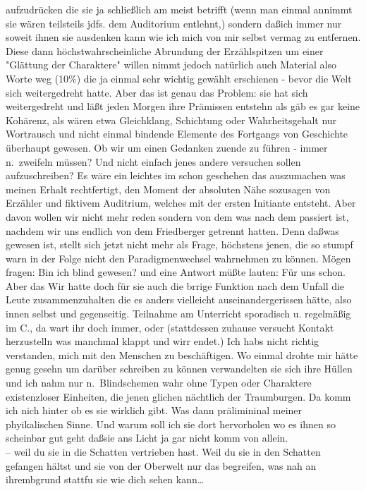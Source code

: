 \documentclass[
]{article}
\begin{document}
aufzudrücken die sie ja schließlich am meist betrifft (wenn man einmal
annimmt sie wären teilsteils jdfs. dem Auditorium entlehnt,) sondern
daßich immer nur soweit ihnen sie ausdenken kann wie ich mich von mir
selbst vermag zu entfernen. Diese dann höchstwahrscheinliche Abrundung
der Erzählspitzen um einer "Glättung der Charaktere" willen nimmt jedoch
natürlich auch Material also Worte weg (10\%) die ja einmal sehr wichtig
gewählt erschienen - bevor die Welt sich weitergedreht hatte. Aber das
ist genau das Problem: sie hat sich weitergedreht und läßt jeden Morgen
ihre Prämissen entstehn als gäb es gar keine Kohärenz, als wären etwa
Gleichklang, Schichtung oder Wahrheitsgehalt nur Wortrausch und nicht
einmal bindende Elemente des Fortgangs von Geschichte überhaupt gewesen.
Ob wir um einen Gedanken zuende zu führen - immer n.~zweifeln müssen?
Und nicht einfach jenes andere versuchen sollen aufzuschreiben? Es wäre
ein leichtes im schon geschehen das auszumachen was meinen Erhalt
rechtfertigt, den Moment der absoluten Nähe sozusagen von Erzähler und
fiktivem Auditrium, welches mit der ersten Initiante entsteht. Aber
davon wollen wir nicht mehr reden sondern von dem was nach dem passiert
ist, nachdem wir uns endlich von dem Friedberger getrennt hatten. Denn
daßwas gewesen ist, stellt sich jetzt nicht mehr als Frage, höchstens
jenen, die so stumpf warn in der Folge nicht den Paradigmenwechsel
wahrnehmen zu können. Mögen fragen: Bin ich blind gewesen? und eine
Antwort müßte lauten: Für uns schon. Aber das Wir hatte doch für sie
auch die brrige Funktion nach dem Unfall die Leute zusammenzuhalten die
es anders vielleicht auseinandergerissen hätte, also innen selbst und
gegenseitig. Teilnahme am Unterricht sporadisch u. regelmäßig im C., da
wart ihr doch immer, oder (stattdessen zuhause versucht Kontakt
herzustelln was manchmal klappt und wirr endet.) Ich habs nicht richtig
verstanden, mich mit den Menschen zu beschäftigen. Wo einmal drohte mir
hätte genug gesehn um darüber schreiben zu können verwandelten sie sich
ihre Hüllen und ich nahm nur n.~Blindschemen wahr ohne Typen oder
Charaktere existenzloser Einheiten, die jenen glichen nächtlich der
Traumburgen. Da komm ich nich hinter ob es sie wirklich gibt. Was dann
prälimininal meiner phyikalischen Sinne. Und warum soll ich sie dort
hervorholen wo es ihnen so scheinbar gut geht daßsie ans Licht ja gar
nicht komm von allein.\\
-- weil du sie in die Schatten vertrieben hast. Weil du sie in den
Schatten gefangen hältst und sie von der Oberwelt nur das begreifen, was
nah an ihrembgrund stattfu sie wie dich sehen kann\ldots{}
\end{document}
